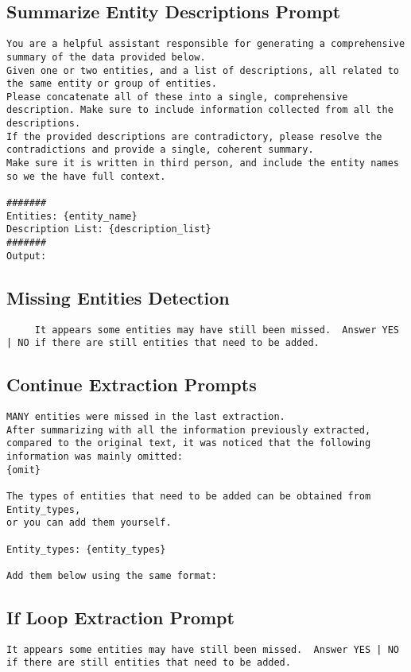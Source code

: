 \subsection{Summarize Entity Descriptions Prompt}\label{prompt:summarize-entity-descriptions}
\begin{lstlisting}
You are a helpful assistant responsible for generating a comprehensive summary of the data provided below.
Given one or two entities, and a list of descriptions, all related to the same entity or group of entities.
Please concatenate all of these into a single, comprehensive description. Make sure to include information collected from all the descriptions.
If the provided descriptions are contradictory, please resolve the contradictions and provide a single, coherent summary.
Make sure it is written in third person, and include the entity names so we the have full context.

#######
Entities: {entity_name}
Description List: {description_list}
#######
Output:
\end{lstlisting}

\subsection{Missing Entities Detection}\label{prompt:missing-entities}
\begin{lstlisting}
     It appears some entities may have still been missed.  Answer YES | NO if there are still entities that need to be added.
\end{lstlisting}

\subsection{Continue Extraction Prompts}\label{prompt:continue-extraction}
\begin{lstlisting}
MANY entities were missed in the last extraction.
After summarizing with all the information previously extracted, compared to the original text, it was noticed that the following information was mainly omitted:
{omit}

The types of entities that need to be added can be obtained from Entity_types,
or you can add them yourself.

Entity_types: {entity_types}

Add them below using the same format:
\end{lstlisting}

\subsection{If Loop Extraction Prompt}\label{prompt:if-loop-extraction}
\begin{lstlisting}
It appears some entities may have still been missed.  Answer YES | NO if there are still entities that need to be added.
\end{lstlisting}

